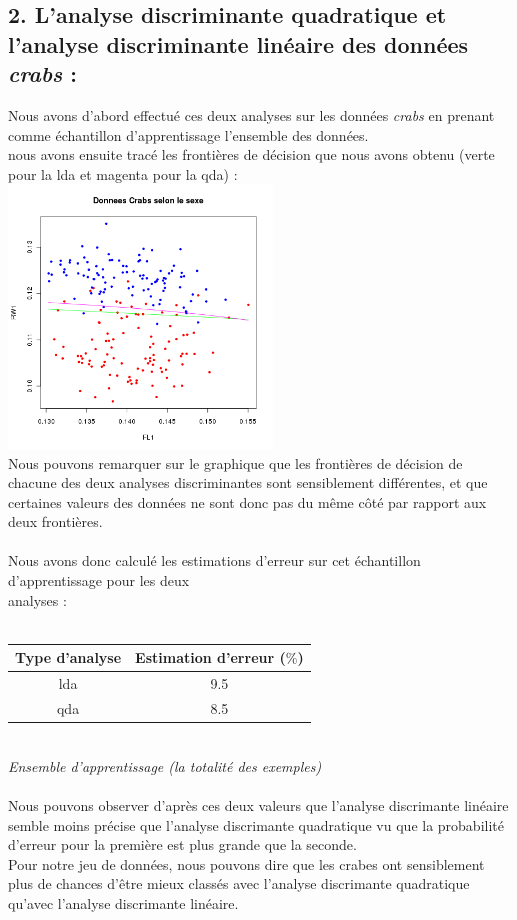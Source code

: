 \documentclass[a4paper, 10pt]{article}
\begin{document}
\subsection*{2. L'analyse discriminante quadratique et l'analyse discriminante linéaire des données \textit{crabs} :}
Nous avons d'abord effectué ces deux analyses sur les données \textit{crabs} en prenant comme échantillon d'apprentissage l'ensemble des données.\\
nous avons ensuite tracé les frontières de décision que nous avons obtenu (verte pour la lda et magenta pour la qda) :\\
\includegraphics[height = 7cm, width = 7cm]{plots/exo2_analyse1.png}\\
Nous pouvons remarquer sur le graphique que les frontières de décision de chacune des deux analyses discriminantes sont sensiblement différentes,
et que certaines valeurs des données ne sont donc pas du même côté par rapport aux deux frontières.\\ \\
Nous avons donc calculé les estimations d'erreur sur cet échantillon d'apprentissage pour les deux\\analyses :\\ \\
\begin{tabular}{|c|c|}
\hline
Type d'analyse & Estimation d'erreur ($\%$) \\
\hline
lda & 9.5 \\
\hline
qda & 8.5\\
\hline
\end{tabular}\\
\textit{Ensemble d'apprentissage (la totalité des exemples)}\\ \\
Nous pouvons observer d'après ces deux valeurs que l'analyse discrimante linéaire semble moins précise que l'analyse discrimante quadratique
vu que la probabilité d'erreur pour la première est plus grande que la seconde.\\
Pour notre jeu de données, nous pouvons dire que les crabes ont sensiblement plus de chances d'être mieux classés avec l'analyse discrimante
quadratique qu'avec l'analyse discrimante linéaire.\\ \\
\end{document}
